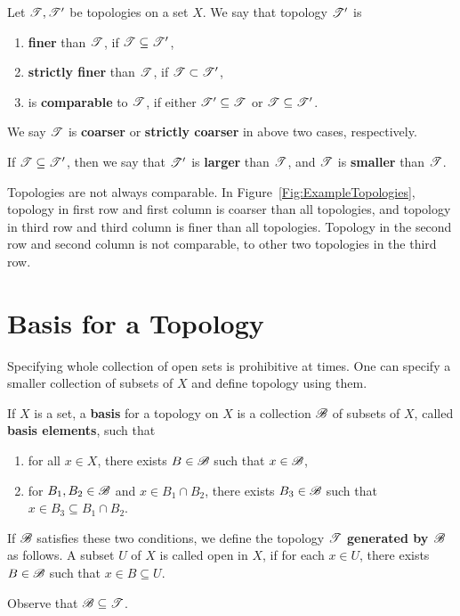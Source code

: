 \documentclass[a4paper,english,12pt]{article}   	%
\begin{document}
\begin{defn}  Let $\mathscr{T}, \mathscr{T}'$ be topologies on a set $X$. We say that topology $\mathscr{T}'$ is 
\begin{enumerate}
	\item \textbf{finer} than $\mathscr{T}$, if $\mathscr{T} \subseteq \mathscr{T}'$,
	\item \textbf{strictly finer} than $\mathscr{T}$, if  $\mathscr{T} \subset \mathscr{T}'$,
	\item is \textbf{comparable} to $\mathscr{T}$, if either $\mathscr{T}' \subseteq \mathscr{T}$ or $\mathscr{T} \subseteq \mathscr{T}'$.
\end{enumerate}
We say $\mathscr{T}$ is \textbf{coarser} or \textbf{strictly coarser} in above two cases, respectively. 
\end{defn}
\begin{defn}
 If $\mathscr{T} \subseteq \mathscr{T}'$, then we say that $\mathscr{T}'$ is \textbf{larger} than $\mathscr{T}$, and $\mathscr{T}$ is \textbf{smaller} than $\mathscr{T}$.
\end{defn}
\begin{rem} Topologies are not always comparable. In Figure~\ref{Fig:ExampleTopologies}, topology in first row and first column is coarser than all topologies, and topology in third row and third column is finer than all topologies. Topology in the second row and second column is not comparable, to other two topologies in the third row.
\end{rem}

\section{Basis for a Topology}
Specifying whole collection of open sets is prohibitive at times. One can specify a smaller collection of subsets of $X$ and define topology using them.
\begin{defn}
 If $X$ is a set, a \textbf{basis} for a topology on $X$ is a collection $\mathscr{B}$ of subsets of $X$, called \textbf{basis elements}, such that 
 \begin{enumerate}
  \item for all $x \in X$, there exists $B \in \mathscr{B}$ such that $x \in \mathscr{B}$,
  \item for $B_1, B_2 \in \mathscr{B}$ and $x \in B_1 \cap B_2$, there exists $B_3 \in \mathscr{B}$ such that $x \in B_3 \subseteq B_1 \cap B_2$.
 \end{enumerate}
	If $\mathscr{B}$ satisfies these two conditions, we define the topology \textbf{$\mathscr{T}$ generated by $\mathscr{B}$} as follows. A subset $U$ of $X$ is called open in $X$, if for each $x \in U$, there exists $B \in \mathscr{B}$ such that $x \in B \subseteq U$. 
\end{defn}
\begin{rem} Observe that $\mathscr{B} \subseteq \mathscr{T}$.
\end{rem}
 
\end{document}
